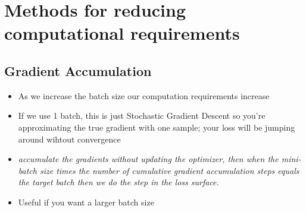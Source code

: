 \documentclass[11pt]{article}
\begin{document}
\section{Methods for reducing computational requirements}

\subsection{Gradient Accumulation}

\begin{minipage}[l]{.5\linewidth}
    \begin{figure}[H]
        \centering
    \end{figure}    
\end{minipage}\hfill
\begin{minipage}[r]{.48\linewidth}
    \begin{itemize}
        \item As we increase the batch size our computation requirements increase
        \item If we use 1 batch, this is just Stochastic Gradient Descent so you're approximating the true gradient with one sample; your loss will be jumping around wihtout convergence 
        \item \emph{accumulate the gradients without updating the optimizer, then when the mini-batch size times the number of cumulative gradient accumulation steps equals the target batch then we do the step in the loss surface.}
        \item Useful if you want a larger batch size
    \end{itemize}
\end{minipage}
\end{document}
